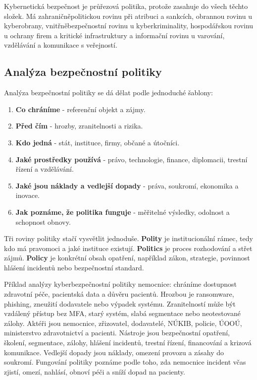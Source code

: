 Kybernetická bezpečnost je průřezová politika, protože zasahuje do všech těchto složek. Má zahraničněpolitickou rovinu při atribuci a sankcích, obrannou rovinu u kyberobrany, vnitřněbezpečnostní rovinu u kyberkriminality, hospodářskou rovinu u ochrany firem a kritické infrastruktury a informační rovinu u varování, vzdělávání a komunikace s veřejností.

\subsection*{Analýza bezpečnostní politiky}
Analýza bezpečnostní politiky se dá dělat podle jednoduché šablony:
\begin{enumerate}
  \item \textbf{Co chráníme} - referenční objekt a zájmy.
  \item \textbf{Před čím} - hrozby, zranitelnosti a rizika.
  \item \textbf{Kdo jedná} - stát, instituce, firmy, občané a útočníci.
  \item \textbf{Jaké prostředky používá} - právo, technologie, finance, diplomacii, trestní řízení a vzdělávání.
  \item \textbf{Jaké jsou náklady a vedlejší dopady} - práva, soukromí, ekonomika a inovace.
  \item \textbf{Jak poznáme, že politika funguje} - měřitelné výsledky, odolnost a schopnost obnovy.
\end{enumerate}

Tři roviny politiky stačí vysvětlit jednoduše. \textbf{Polity} je institucionální rámec, tedy kdo má pravomoci a jaké instituce existují. \textbf{Politics} je proces rozhodování a střet zájmů. \textbf{Policy} je konkrétní obsah opatření, například zákon, strategie, povinnost hlášení incidentů nebo bezpečnostní standard.

Příklad analýzy kyberbezpečnostní politiky nemocnice: chráníme dostupnost zdravotní péče, pacientská data a důvěru pacientů. Hrozbou je ransomware, phishing, zneužití dodavatele nebo výpadek systému. Zranitelností může být vzdálený přístup bez MFA, starý systém, slabá segmentace nebo neotestované zálohy. Aktéři jsou nemocnice, zřizovatel, dodavatelé, NÚKIB, policie, ÚOOÚ, ministerstvo zdravotnictví a pacienti. Nástroje jsou bezpečnostní opatření, školení, segmentace, zálohy, hlášení incidentů, trestní řízení, financování a krizová komunikace. Vedlejší dopady jsou náklady, omezení provozu a zásahy do soukromí. Fungování politiky poznáme podle toho, zda nemocnice incident včas zjistí, omezí, nahlásí, obnoví péči a sníží dopad na pacienty.

